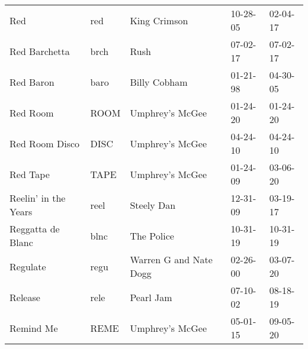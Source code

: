 \begin{longtable}{p{}p{}p{}p{}p{}}
                                                                     Red &           red &                                             King Crimson &              10-28-05 &             02-04-17 \\
                                                           Red Barchetta &          brch &                                                     Rush &              07-02-17 &             07-02-17 \\
                                                               Red Baron &          baro &                                             Billy Cobham &              01-21-98 &             04-30-05 \\
                                                                Red Room &          ROOM &                                          Umphrey's McGee &              01-24-20 &             01-24-20 \\
                                                          Red Room Disco &          DISC &                                          Umphrey's McGee &              04-24-10 &             04-24-10 \\
                                                                Red Tape &          TAPE &                                          Umphrey's McGee &              01-24-09 &             03-06-20 \\
                                                    Reelin' in the Years &          reel &                                               Steely Dan &              12-31-09 &             03-19-17 \\
                                                       Reggatta de Blanc &          blnc &                                               The Police &              10-31-19 &             10-31-19 \\
                                                                Regulate &          regu &                                   Warren G and Nate Dogg &              02-26-00 &             03-07-20 \\
                                                                 Release &          rele &                                                Pearl Jam &              07-10-02 &             08-18-19 \\
                                                               Remind Me &          REME &                                          Umphrey's McGee &              05-01-15 &             09-05-20 \\

\end{longtable}
